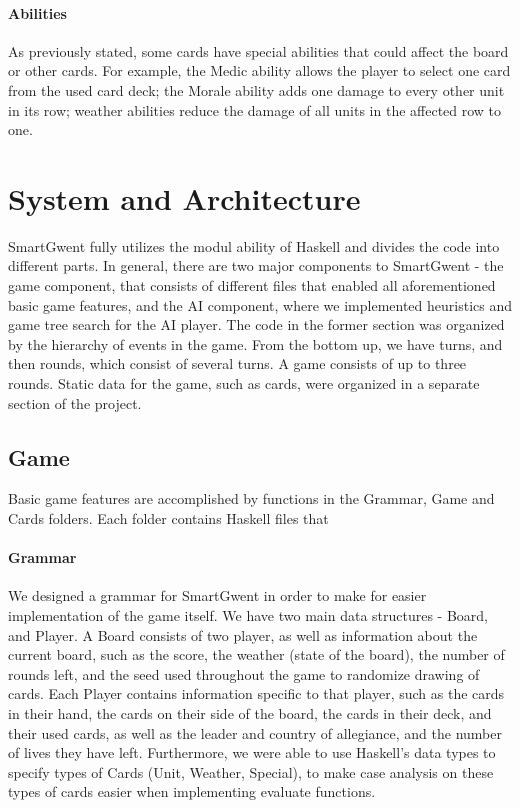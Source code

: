 \documentclass[numbers]{sigplanconf}
\begin{document}
\paragraph{Abilities}
As previously stated, some cards have special abilities that could affect the board or other cards. For example, the Medic ability allows the player to select one card from the used card deck; the Morale ability adds one damage to every other unit in its row; weather abilities reduce the damage of all units in the affected row to one.


\section{System and Architecture}
SmartGwent fully utilizes the modul ability of Haskell and divides the code into different parts. In general, there are two major components to SmartGwent - the game component, that consists of different files that enabled all aforementioned basic game features, and the AI component, where we implemented heuristics and game tree search for the AI player. The code in the former section was organized by the hierarchy of events in the game. From the bottom up, we have turns, and then rounds, which consist of several turns. A game consists of up to three rounds. Static data for the game, such as cards, were organized in a separate section of the project. 
\subsection{Game}
Basic game features are accomplished by functions in the Grammar, Game and Cards folders. Each folder contains Haskell files that 
\paragraph{Grammar} We designed a grammar for SmartGwent in order to make for easier implementation of the game itself. We have two main data structures - Board, and Player. A Board consists of two player, as well as information about the current board, such as the score, the weather (state of the board), the number of rounds left, and the seed used throughout the game to randomize drawing of cards. Each Player contains information specific to that player, such as the cards in their hand, the cards on their side of the board, the cards in their deck, and their used cards, as well as the leader and country of allegiance, and the number of lives they have left. Furthermore, we were able to use Haskell's data types to specify types of Cards (Unit, Weather, Special), to make case analysis on these types of cards easier when implementing evaluate functions.
\end{document}
